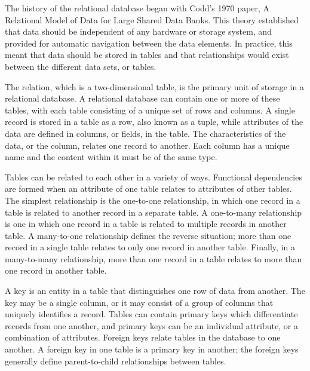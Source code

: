 \newpage


 

The history of the relational database began with Codd's 1970 paper, A Relational Model of Data for Large Shared Data Banks. This theory established that data should be independent of any hardware or storage system, and provided for automatic navigation between the data elements. In practice, this meant that data should be stored in tables and that relationships would exist between the different data sets, or tables.


 

The relation, which is a two-dimensional table, is the primary unit of storage in a relational database. A relational database can contain one or more of these tables, with each table consisting of a unique set of rows and columns. A single record is stored in a table as a row, also known as a tuple, while attributes of the data are defined in columns, or fields, in the table. The characteristics of the data, or the column, relates one record to another. Each column has a unique name and the content within it must be of the same type.


 

Tables can be related to each other in a variety of ways. Functional dependencies are formed when an attribute of one table relates to attributes of other tables. The simplest relationship is the one-to-one relationship, in which one record in a table is related to another record in a separate table. A one-to-many relationship is one in which one record in a table is related to multiple records in another table. A many-to-one relationship defines the reverse situation; more than one record in a single table relates to only one record in another table. Finally, in a many-to-many relationship, more than one record in a table relates to more than one record in another table.


 

A key is an entity in a table that distinguishes one row of data from another. The key may be a single column, or it may consist of a group of columns that uniquely identifies a record. Tables can contain primary keys which differentiate records from one another, and primary keys can be an individual attribute, or a combination of attributes. Foreign keys relate tables in the database to one another. A foreign key in one table is a primary key in another; the foreign keys generally define parent-to-child relationships between tables.


